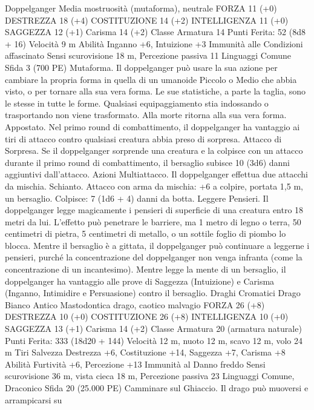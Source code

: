 \begin{multicols}{2}
Doppelganger
Media mostruosità (mutaforma), neutrale
FORZA 11 (+0)
DESTREZZA 18 (+4)
COSTITUZIONE 14 (+2)
INTELLIGENZA 11 (+0)
SAGGEZZA 12 (+1)
Carisma 14 (+2)
Classe Armatura 14
\hspace*{0pt}\hfill{Punti Ferita}: 52 (8d8 + 16)
Velocità 9 m
Abilità Inganno +6, Intuizione +3
Immunità alle Condizioni affascinato
Sensi scurovisione 18 m, Percezione passiva 11
Linguaggi Comune
Sfida 3 (700 PE)
Mutaforma. Il doppelganger può usare la sua azione per
cambiare la propria forma in quella di un umanoide Piccolo o
Medio che abbia visto, o per tornare alla sua vera forma. Le sue
statistiche, a parte la taglia, sono le stesse in tutte le forme.
Qualsiasi equipaggiamento stia indossando o trasportando non
viene trasformato. Alla morte ritorna alla sua vera forma.
Appostato. Nel primo round di combattimento, il doppelganger
ha vantaggio ai tiri di attacco contro qualsiasi creatura abbia
preso di sorpresa.
Attacco di Sorpresa. Se il doppelganger sorprende una creatura e
la colpisce con un attacco durante il primo round di
combattimento, il bersaglio subisce 10 (3d6) danni aggiuntivi
dall’attacco.
Azioni
Multiattacco. Il doppelganger effettua due attacchi da mischia.
Schianto. Attacco con arma da mischia: +6 a colpire, portata 1,5
m, un bersaglio.
Colpisce: 7 (1d6 + 4) danni da botta.
Leggere Pensieri. Il doppelganger legge magicamente i pensieri
di superficie di una creatura entro 18 metri da lui. L’effetto può
penetrare le barriere, ma 1 metro di legno o terra, 50 centimetri
di pietra, 5 centimetri di metallo, o un sottile foglio di piombo lo
blocca. Mentre il bersaglio è a gittata, il doppelganger può
continuare a leggerne i pensieri, purché la concentrazione del
doppelganger non venga infranta (come la concentrazione di un
incantesimo). Mentre legge la mente di un bersaglio, il
doppelganger ha vantaggio alle prove di Saggezza (Intuizione) e
Carisma (Inganno, Intimidire e Persuasione) contro il bersaglio.
Draghi Cromatici
Drago Bianco Antico
Mastodontica drago, caotico malvagio
FORZA 26 (+8)
DESTREZZA 10 (+0)
COSTITUZIONE 26 (+8)
INTELLIGENZA 10 (+0)
SAGGEZZA 13 (+1)
Carisma 14 (+2)
Classe Armatura 20 (armatura naturale)
\hspace*{0pt}\hfill{Punti Ferita}: 333 (18d20 + 144)
Velocità 12 m, nuoto 12 m, scavo 12 m, volo 24 m
Tiri Salvezza Destrezza +6, Costituzione +14, Saggezza +7,
Carisma +8
Abilità Furtività +6, Percezione +13
Immunità al Danno freddo
Sensi scurovisione 36 m, vista cieca 18 m, Percezione passiva 23
Linguaggi Comune, Draconico
Sfida 20 (25.000 PE)
Camminare sul Ghiaccio. Il drago può muoversi e arrampicarsi su

\end{multicols}
